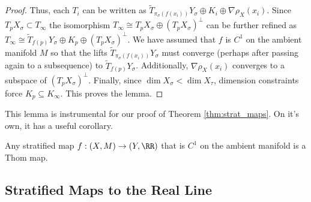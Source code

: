 \begin{proof}
	Thus, each $T_i$ can be written as $\tilde{T}_{\pi_{\sigma}(f(x_i))} Y_{\sigma}\oplus K_i \oplus \nabla \rho_{X}(x_i)$. Since $T_p X_{\sigma}\subset T_{\infty}$ the isomorphism $T_{\infty}\cong T_p X_{\sigma}\oplus (T_p X_{\sigma})^{\perp}$ can be further refined as $T_{\infty}\cong \tilde{T}_{f(p)} Y_{\sigma} \oplus K_p \oplus (T_p X_{\sigma})^{\perp}$. We have assumed that $f$ is $C^1$ on the ambient manifold $M$ so that the lifts $\tilde{T}_{\pi_{\sigma}(f(x_i))} Y_{\sigma}$ must converge (perhaps after passing again to a subsequence) to $\tilde{T}_{f(p)} Y_{\sigma}$. Additionally, $\nabla \rho_X(x_i)$ converges to a subspace of $(T_p X_{\sigma})^{\perp}$. Finally, since $\dim X_{\sigma}< \dim X_{\tau}$, dimension constraints force $K_p\subseteq K_{\infty}$. This proves the lemma.
\end{proof}

This lemma is instrumental for our proof of Theorem \ref{thm:strat_maps}. On it's own, it has a useful corollary.

\begin{cor}
	Any stratified map $f:(X,M)\to (Y,\RR)$ that is $C^1$ on the ambient manifold is a Thom map.
\end{cor}

\subsection{Stratified Maps to the Real Line}

